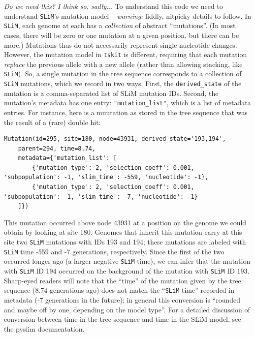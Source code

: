 \documentclass[12pt]{article}
\newcommand{\tskit}[0]{\texttt{tskit}\xspace}
\newcommand{\slim}[0]{\texttt{SLiM}\xspace}
\newcommand{\comment}[1]{\textit{\color{green} #1}}
\begin{document}
\comment{Do we need this? I think so, sadly...}
To understand this code we need to understand \slim's mutation model --
\emph{warning:} fiddly, nitpicky details to follow.
In \slim, each genome at each has a \emph{collection} of abstract ``mutations''.
(In most cases, there will be zero or one mutation at a given position,
but there can be more.)
Mutations thus do not necessarily represent single-nucleotide changes.
However, the mutation model in \tskit is different, requiring that each mutation
\emph{replace} the previous allele with a new allele (rather than allowing stacking, like \slim).
So, a single mutation in the tree sequence corresponds to a collection of \slim mutations,
which we record in two ways.
First, the \verb|derived_state| of the mutation is a comma-separated list of SLiM mutation IDs.
Second, the mutation's metadata has one entry: \verb|"mutation_list"|,
which is a list of metadata entries.
For instance, here is a muutation as stored in the tree sequence
that was the result of a (rare) double hit:
\begin{listing}[H]
    \begin{verbatim}
Mutation(id=295, site=180, node=43931, derived_state='193,194',
    parent=294, time=8.74,
    metadata={'mutation_list': [
        {'mutation_type': 2, 'selection_coeff': 0.001, 'subpopulation': -1, 'slim_time': -559, 'nucleotide': -1},
        {'mutation_type': 2, 'selection_coeff': 0.001, 'subpopulation': -1, 'slim_time': -7, 'nucleotide': -1}
    ]})
    \end{verbatim}
\end{listing}
This mutation occurred
above node 43931 at a position on the genome we could obtain by looking at site 180.
Genomes that inherit this mutation carry at this site two \slim mutations with IDs 193 and 194;
these mutations are labeled with \slim time -559 and -7 generations, respectively.
Since the first of the two occurred longer ago (a larger negative \slim time),
we can infer that the mutation with \slim ID 194 occurred on the background
of the mutation with \slim ID 193.
Sharp-eyed readers will note that the ``time'' of the mutation given by the tree sequence
(8.74 generations ago) does not match the ``\slim time'' recorded in metadata
(-7 generations in the future);
in general this conversion is ``rounded and maybe off by one, depending on the model type''.
For a detailed discussion of conversion between time in the tree sequence
and time in the SLiM model, see the pyslim documentation.
\end{document}
